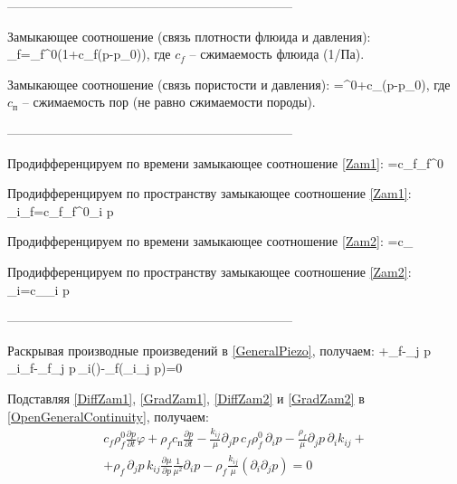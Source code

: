 \documentclass[main.tex]{subfiles}
\begin{document}
--------------------------------------------------------------------

Замыкающее соотношение (связь плотности флюида и давления):
\beq\label{Zam1}
\rho_f=\rho_f^0\left(1+c_f\left(p-p_0\right)\right),
\eeq
где $c_f$ -- сжимаемость флюида (1/Па).


Замыкающее соотношение (связь пористости и давления):
\beq\label{Zam2}
\varphi=\varphi^0+c_{}\left(p-p_0\right),
\eeq
где $c_{\text{п}}$ -- сжимаемость пор (не равно сжимаемости породы).

--------------------------------------------------------------------

Продифференцируем по времени замыкающее соотношение \eqref{Zam1}:
\beq\label{DiffZam1}
=c_f\rho_f^0
\eeq

Продифференцируем по пространству замыкающее соотношение \eqref{Zam1}:
\beq\label{GradZam1}
\partial_i\rho_f=c_f\rho_f^0\partial_i p
\eeq

Продифференцируем по времени замыкающее соотношение \eqref{Zam2}:
\beq\label{DiffZam2}
=c_
\eeq

Продифференцируем по пространству замыкающее соотношение \eqref{Zam2}:
\beq\label{GradZam2}
\partial_i\varphi=c_\partial_i p
\eeq

--------------------------------------------------------------------

Раскрывая производные произведений в \eqref{GeneralPiezo}, получаем:
\beq\label{OpenGeneralContinuity}
\varphi+\rho_f-\partial_j p\,\partial_i\rho_f-\rho_f\partial_j p\,\partial_i\!\left(\right)-\rho_f\left(\partial_i\partial_j p\right)=0
\eeq

Подставляя \eqref{DiffZam1}, \eqref{GradZam1}, \eqref{DiffZam2} и \eqref{GradZam2} в \eqref{OpenGeneralContinuity}, получаем:
\begin{multline}\label{Expanded}
c_f\rho_f^0\frac{\partial p}{\partial t}\varphi+\rho_f c_\text{п}\frac{\partial p}{\partial t}-\frac{k_{ij}}{\mu}\partial_j p\,c_f\rho_f^0\,\partial_i p-\frac{\rho_f}{\mu}\partial_j p\,\partial_i k_{ij}+\\+\rho_f\,\partial_j p\,k_{ij}\frac{\partial\mu}{\partial p}\frac{1}{\mu^2}\partial_i p-\rho_f\frac{k_{ij}}{\mu}\left(\partial_i\partial_j p\right)=0
\end{multline}
\end{document}
